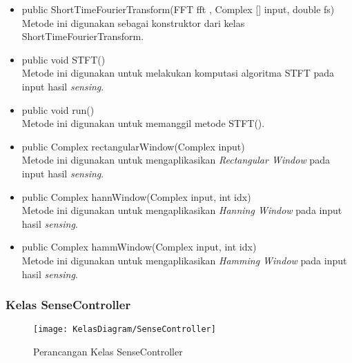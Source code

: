 \begin{itemize}
	\item public ShortTimeFourierTransform(FFT fft , Complex [] input, double fs) \\
		Metode ini digunakan sebagai konstruktor dari kelas ShortTimeFourierTransform.
	\item public void STFT() \\
		Metode ini digunakan untuk melakukan komputasi algoritma STFT pada input hasil {\it sensing}.
	\item public void run() \\
		Metode ini digunakan untuk memanggil metode STFT().
	\item public Complex rectangularWindow(Complex input) \\
		Metode ini digunakan untuk mengaplikasikan {\it Rectangular Window} pada input hasil {\it sensing}.
	\item public Complex hannWindow(Complex input, int idx) \\
		Metode ini digunakan untuk mengaplikasikan {\it Hanning Window} pada input hasil {\it sensing}.
	\item public Complex hammWindow(Complex input, int idx) \\
		Metode ini digunakan untuk mengaplikasikan {\it Hamming Window} pada input hasil {\it sensing}.
		
\end{itemize}

\subsubsection{Kelas SenseController}
\begin{figure}[H]
	\centering
	\texttt{[image: KelasDiagram/SenseController]}  
	\caption[Perancangan Kelas SenseController]{Perancangan Kelas SenseController} 
	\label{fig:KelasSenseController} 
\end{figure}

